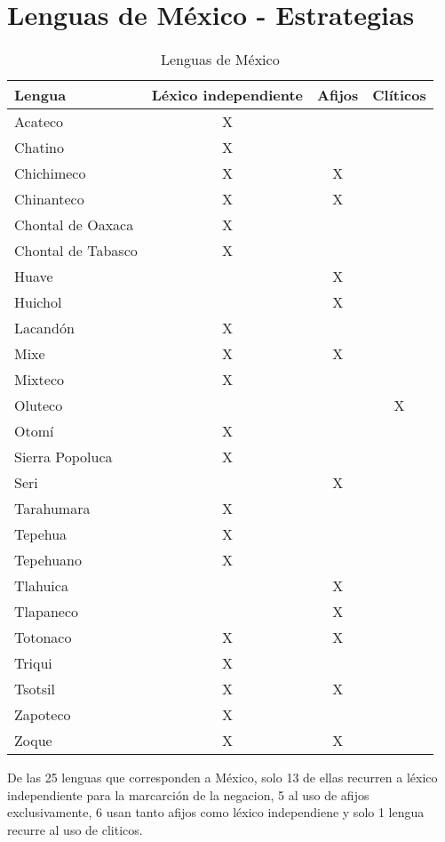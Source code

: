 \section*{Lenguas de México - Estrategias}

\begin{table}[h]
\centering
\begin{tabular}{lccc}
\textbf{Lengua} & \textbf{Léxico independiente} & \textbf{Afijos} & \textbf{Clíticos} \\
\hline
Acateco & X     &       &  \\
Chatino & X     &       &  \\
Chichimeco & X     & X     &  \\
Chinanteco & X     & X     &  \\
Chontal de Oaxaca & X     &       &  \\
Chontal de Tabasco & X     &       &  \\
Huave &       & X     &  \\
Huichol &       & X     &  \\
Lacandón & X     &       &  \\
Mixe  & X     & X     &  \\
Mixteco & X     &       &  \\
Oluteco &       &       & X \\
Otomí & X     &       &  \\
Sierra Popoluca & X     &       &  \\
Seri  &       & X     &  \\
Tarahumara & X     &       &  \\
Tepehua & X     &       &  \\
Tepehuano & X     &       &  \\
Tlahuica &       & X     &  \\
Tlapaneco &       & X     &  \\
Totonaco & X     & X     &  \\
Triqui & X     &       &  \\
Tsotsil & X     & X     &  \\
Zapoteco & X     &       &  \\
Zoque & X     & X     &  \\
\hline
\end{tabular}
\caption{Lenguas de México}
\label{cuadro1}
\end{table}
  
\noindent De las 25 lenguas que corresponden a México, solo 13 de ellas recurren a léxico independiente para la marcarción de la negacion, 5 al uso de afijos exclusivamente, 6 usan tanto afijos como léxico independiene y solo 1 lengua recurre al uso de cliticos.

